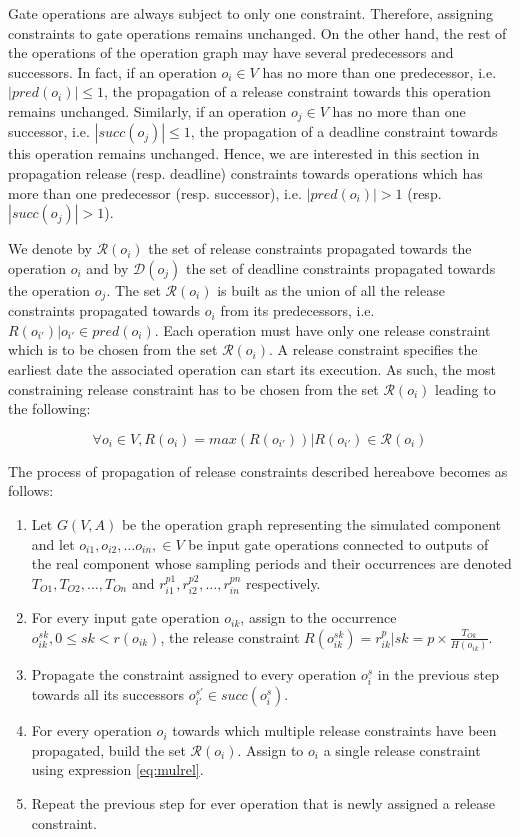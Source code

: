 Gate operations are always subject to only one constraint. Therefore, assigning constraints to gate operations remains unchanged. On the other hand, the rest of the operations of the operation graph may have several predecessors and successors. In fact, if an operation $o_i \in V$ has no more than one predecessor, i.e. $|pred(o_i)| \leq 1$, the propagation of a release constraint towards this operation remains unchanged. Similarly, if an operation $o_j \in V$ has no more than one successor, i.e. $|succ(o_j)| \leq 1$, the propagation of a deadline constraint towards this operation remains unchanged. Hence, we are interested in this section in propagation release (resp. deadline) constraints towards operations which has more than one predecessor (resp. successor), i.e. $|pred(o_i)| > 1$ (resp. $|succ(o_j)| > 1$). 

We denote by $\mathcal{R}(o_i)$ the set of release constraints propagated towards the operation $o_i$ and by $\mathcal{D}(o_j)$ the set of deadline constraints propagated towards the operation $o_j$. The set $\mathcal{R}(o_i)$ is built as the union of all the release constraints propagated towards $o_i$ from its predecessors, i.e. $R(o_{i'}) | o_{i'} \in pred(o_i)$. Each operation must have only one release constraint which is to be chosen from the set $\mathcal{R}(o_i)$. A release constraint specifies the earliest date the associated operation can start its execution. As such, the most constraining release constraint has to be chosen from the set $\mathcal{R}(o_i)$ leading to the following:

\begin{equation}
\forall o_i \in V, R(o_i) = max(R(o_{i'})) | R(o_{i'}) \in \mathcal{R}(o_i)
\label{eq:mulrel}
\end{equation}

The process of propagation of release constraints described hereabove becomes as follows:

\begin{enumerate}
\item Let $G(V,A)$ be the operation graph representing the simulated component and let $o_{i1}, o_{i2}, \ldots o_{in},\in  V$ be input gate operations connected to outputs of the real component whose sampling periods and their occurrences are denoted $T_{O1}, T_{O2}, \ldots, T_{On}$ and $r_{i1}^{p1}, r_{i2}^{p2}, \ldots, r_{in}^{pn}$ respectively.
\item For every input gate operation $o_{ik}$, assign to the occurrence $o_{ik}^{sk}, 0 \leq sk < r(o_{ik})$, the release constraint $R(o_{ik}^{sk}) = r_{ik}^p | sk = p \times \frac{T_{Ok}}{H(o_{ik})}$.
\item Propagate the constraint assigned to every operation $o_i^s$ in the previous step towards all its successors $o_{i'}^{s'} \in succ(o_i^s)$.
\item For every operation $o_i$ towards which multiple release constraints have been propagated, build the set $\mathcal{R}(o_i)$. Assign to $o_i$ a single release constraint using expression \ref{eq:mulrel}.
\item Repeat the previous step for ever operation that is newly assigned a release constraint.
\end{enumerate}

